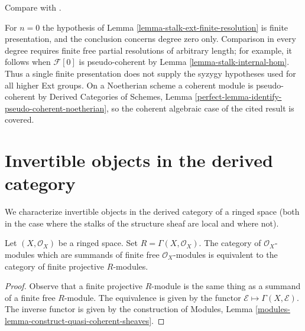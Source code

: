 \begin{remark}
\label{remark-stalk-ext-finite-presentation}
\begin{reference}
Compare with \cite[Expos\'e 149, Proposition 2, pp. 170--171]{FGA}.
\end{reference}
For $n = 0$ the hypothesis of
Lemma \ref{lemma-stalk-ext-finite-resolution} is finite presentation, and
the conclusion concerns degree zero only. Comparison in every degree
requires finite free partial resolutions of arbitrary length; for example,
it follows when $\mathcal{F}[0]$ is pseudo-coherent by
Lemma \ref{lemma-stalk-internal-hom}. Thus a single finite presentation does
not supply the syzygy hypotheses used for all higher Ext groups. On a
Noetherian scheme a coherent module is pseudo-coherent by Derived Categories
of Schemes, Lemma
\ref{perfect-lemma-identify-pseudo-coherent-noetherian}, so the coherent
algebraic case of the cited result is covered.
\end{remark}







\section{Invertible objects in the derived category}
\label{section-invertible-D-or-R}

\noindent
We characterize invertible objects in the derived category of
a ringed space (both in the case where the stalks of the
structure sheaf are local and where not).

\begin{lemma}
\label{lemma-category-summands-finite-free}
Let $(X, \mathcal{O}_X)$ be a ringed space.
Set $R = \Gamma(X, \mathcal{O}_X)$. The category of
$\mathcal{O}_X$-modules which are summands of finite free
$\mathcal{O}_X$-modules is equivalent to the category of
finite projective $R$-modules.
\end{lemma}

\begin{proof}
Observe that a finite projective $R$-module is the same thing
as a summand of a finite free $R$-module.
The equivalence is given by the functor $\mathcal{E} \mapsto
\Gamma(X, \mathcal{E})$. The inverse functor is given by the construction of
Modules, Lemma \ref{modules-lemma-construct-quasi-coherent-sheaves}.
\end{proof}


